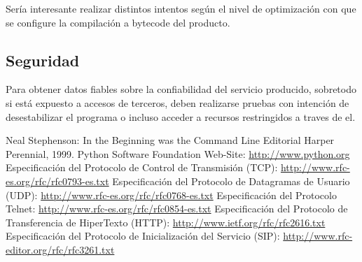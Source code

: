 \documentclass[a4paper,spanish,12pt]{book}
\begin{document}
Sería interesante realizar distintos intentos según el nivel de optimización con que se configure la compilación a bytecode del producto.


\subsection{Seguridad}
Para obtener datos fiables sobre la confiabilidad del servicio producido, sobretodo si está expuesto a accesos de terceros, deben realizarse pruebas con intención de desestabilizar el programa o incluso acceder a recursos restringidos a traves de el.


\appendix


\begin{thebibliography}{99}
 Neal Stephenson: In the Beginning was the Command Line
	Editorial Harper Perennial, 1999.
 Python Software Foundation Web-Site: \url{http://www.python.org}
 Especificación del Protocolo de Control de Transmisión (TCP): \url{http://www.rfc-es.org/rfc/rfc0793-es.txt}
 Especificación del Protocolo de Datagramas de Usuario (UDP): \url{http://www.rfc-es.org/rfc/rfc0768-es.txt}
 Especificación del Protocolo Telnet: \url{http://www.rfc-es.org/rfc/rfc0854-es.txt}
 Especificación del Protocolo de Transferencia de HiperTexto (HTTP): \url{http://www.ietf.org/rfc/rfc2616.txt}
 Especificación del Protocolo de Inicialización del Servicio (SIP): \url{http://www.rfc-editor.org/rfc/rfc3261.txt}
\end{thebibliography}
\end{document}
